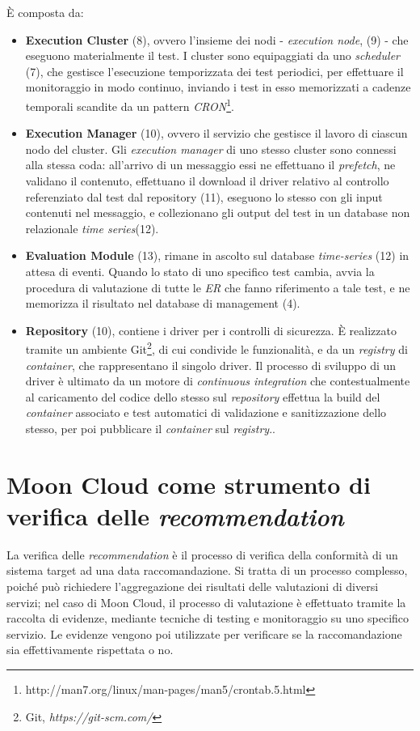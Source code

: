 \documentclass[../main.tex]{subfiles}
\begin{document}
È composta da:
\begin{itemize}
    \item \textbf{Execution Cluster} (8), ovvero l'insieme dei nodi - \textit{execution node}, (9)  - che eseguono materialmente il test. I cluster sono equipaggiati da uno \textit{scheduler} (7), che gestisce l'esecuzione temporizzata dei test periodici, per effettuare il monitoraggio in modo continuo, inviando i test in esso memorizzati a cadenze temporali scandite da un pattern \textit{CRON}\footnote{http://man7.org/linux/man-pages/man5/crontab.5.html}.
    \item \textbf{Execution Manager} (10), ovvero il servizio che gestisce il lavoro di ciascun nodo del cluster.        
        Gli \textit{execution manager} di uno stesso cluster sono connessi alla stessa coda: all'arrivo di un messaggio essi ne effettuano il \textit{prefetch}, ne validano il contenuto, effettuano il download il driver relativo al controllo referenziato dal test dal repository (11), eseguono lo stesso con gli input contenuti nel messaggio, e collezionano gli output del test in un database non relazionale \textit{time series}(12).
    \item \textbf{Evaluation Module} (13), rimane in ascolto sul database \textit{time-series} (12) in attesa di eventi. Quando lo stato di uno specifico test cambia, avvia la procedura di valutazione di tutte le \textit{ER} che fanno riferimento a tale test, e ne memorizza il risultato nel database di management (4).
    \item \textbf{Repository} (10), contiene i driver per i controlli di sicurezza. È realizzato tramite un ambiente Git\footnote{Git, \textit{https://git-scm.com/}}, di cui condivide le funzionalità, e da un \textit{registry} di \textit{container}, che rappresentano il singolo driver. Il processo di sviluppo di un driver è ultimato da un motore di \textit{continuous integration} che contestualmente al caricamento del codice dello stesso sul \textit{repository} effettua la build del \textit{container} associato e test automatici di validazione e sanitizzazione dello stesso, per poi pubblicare il \textit{container} sul \textit{registry}..
\end{itemize}
\section{Moon Cloud come strumento di verifica delle \textit{recommendation}}

La verifica delle \textit{recommendation} è il processo di verifica della conformità di un sistema target ad una data raccomandazione.
Si tratta di un processo complesso, poiché può richiedere l'aggregazione dei risultati delle valutazioni di diversi servizi; nel caso di Moon Cloud, il processo di valutazione è effettuato tramite la raccolta di evidenze, mediante tecniche di testing e monitoraggio su uno specifico servizio. 
Le evidenze vengono poi utilizzate per verificare se la raccomandazione sia effettivamente rispettata o no.
\end{document}
